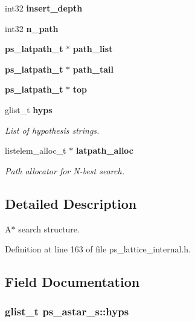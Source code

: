 \begin{DoxyCompactItemize}
\item 
int32 {\bfseries insert\+\_\+depth}\label{structps__astar__s_a50798b1396b3f565b2584ffeb1245b5d}

\item 
int32 {\bfseries n\+\_\+path}\label{structps__astar__s_a12ba7d143c867b1f1e55dfdfae3e6236}

\item 
{\bf ps\+\_\+latpath\+\_\+t} $\ast$ {\bfseries path\+\_\+list}\label{structps__astar__s_a4474da488f4e1545d395c65c39679b8c}

\item 
{\bf ps\+\_\+latpath\+\_\+t} $\ast$ {\bfseries path\+\_\+tail}\label{structps__astar__s_abbfec3e490a6bfd56b75ec419ad9f058}

\item 
{\bf ps\+\_\+latpath\+\_\+t} $\ast$ {\bfseries top}\label{structps__astar__s_aa995e464c2df2594824602e55afb25a8}

\item 
glist\+\_\+t {\bf hyps}
\begin{DoxyCompactList}\small\item\em List of hypothesis strings. \end{DoxyCompactList}\item 
listelem\+\_\+alloc\+\_\+t $\ast$ {\bf latpath\+\_\+alloc}
\begin{DoxyCompactList}\small\item\em Path allocator for N-\/best search. \end{DoxyCompactList}\end{DoxyCompactItemize}


\subsection{Detailed Description}
A$\ast$ search structure. 

Definition at line 163 of file ps\+\_\+lattice\+\_\+internal.\+h.



\subsection{Field Documentation}
\subsubsection[{hyps}]{\setlength{\rightskip}{0pt plus 5cm}glist\+\_\+t ps\+\_\+astar\+\_\+s\+::hyps}\label{structps__astar__s_ace603617a74a81575519ae1bb94720c4}


